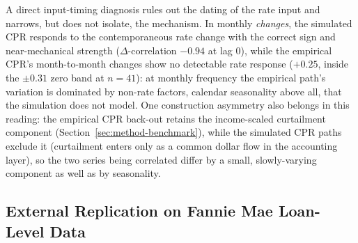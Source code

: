 \documentclass[12pt]{article}
\begin{document}
A direct input-timing diagnosis rules out the dating of the rate input and narrows, but does not isolate, the mechanism. In monthly \emph{changes}, the simulated CPR responds to the contemporaneous rate change with the correct sign and near-mechanical strength ($\Delta$-correlation $-0.94$ at lag 0), while the empirical CPR's month-to-month changes show no detectable rate response ($+0.25$, inside the $\pm 0.31$ zero band at $n = 41$): at monthly frequency the empirical path's variation is dominated by non-rate factors, calendar seasonality above all, that the simulation does not model. One construction asymmetry also belongs in this reading: the empirical CPR back-out retains the income-scaled curtailment component (Section~\ref{sec:method-benchmark}), while the simulated CPR paths exclude it (curtailment enters only as a common dollar flow in the accounting layer), so the two series being correlated differ by a small, slowly-varying component as well as by seasonality.

\subsection{External Replication on Fannie Mae Loan-Level Data}\label{sec:pathb-fannie}
\end{document}
